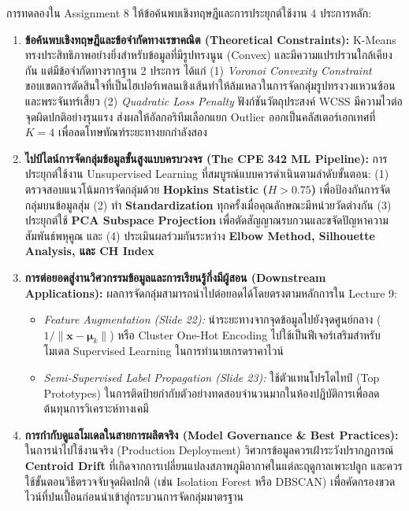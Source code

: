 \documentclass[12pt,a4paper]{article}
\begin{document}
การทดลองใน Assignment 8 ให้ข้อค้นพบเชิงทฤษฎีและการประยุกต์ใช้งาน 4 ประการหลัก:
\begin{enumerate}[leftmargin=1.5em, itemsep=2.0pt]
    \item \textbf{ข้อค้นพบเชิงทฤษฎีและข้อจำกัดทางเรขาคณิต (Theoretical Constraints):} K-Means ทรงประสิทธิภาพอย่างยิ่งสำหรับข้อมูลที่มีรูปทรงนูน (Convex) และมีความแปรปรวนใกล้เคียงกัน แต่มีข้อจำกัดทางรากฐาน 2 ประการ ได้แก่ (1) \textit{Voronoi Convexity Constraint} ขอบเขตการตัดสินใจที่เป็นไฮเปอร์เพลนเชิงเส้นทำให้ล้มเหลวในการจัดกลุ่มรูปทรงวงแหวนซ้อนและพระจันทร์เสี้ยว (2) \textit{Quadratic Loss Penalty} ฟังก์ชันวัตถุประสงค์ WCSS มีความไวต่อจุดผิดปกติอย่างรุนแรง ส่งผลให้อัลกอริทึมเลือกแยก Outlier ออกเป็นคลัสเตอร์เอกเทศที่ $K=4$ เพื่อลดโทษทัณฑ์ระยะทางยกกำลังสอง
    \item \textbf{ไปป์ไลน์การจัดกลุ่มข้อมูลขั้นสูงแบบครบวงจร (The CPE 342 ML Pipeline):} การประยุกต์ใช้งาน Unsupervised Learning ที่สมบูรณ์แบบควรดำเนินตามลำดับขั้นตอน: (1) ตรวจสอบแนวโน้มการจัดกลุ่มด้วย \textbf{Hopkins Statistic ($H > 0.75$)} เพื่อป้องกันการจัดกลุ่มบนข้อมูลสุ่ม (2) ทำ \textbf{Standardization} ทุกครั้งเมื่อคุณลักษณะมีหน่วยวัดต่างกัน (3) ประยุกต์ใช้ \textbf{PCA Subspace Projection} เพื่อตัดสัญญาณรบกวนและขจัดปัญหาความสัมพันธ์พหุคูณ และ (4) ประเมินผลร่วมกันระหว่าง \textbf{Elbow Method, Silhouette Analysis, และ CH Index}
    \item \textbf{การต่อยอดสู่งานวิศวกรรมข้อมูลและการเรียนรู้กึ่งมีผู้สอน (Downstream Applications):} ผลการจัดกลุ่มสามารถนำไปต่อยอดได้โดยตรงตามหลักการใน Lecture 9:
    \begin{itemize}[leftmargin=1.2em, itemsep=1.0pt, topsep=1.0pt]
        \item \textit{Feature Augmentation (Slide 22):} นำระยะทางจากจุดข้อมูลไปยังจุดศูนย์กลาง ($1/\|\mathbf{x} - \boldsymbol{\mu}_k\|$) หรือ Cluster One-Hot Encoding ไปใช้เป็นฟีเจอร์เสริมสำหรับโมเดล Supervised Learning ในการทำนายเกรดราคาไวน์
        \item \textit{Semi-Supervised Label Propagation (Slide 23):} ใช้ตัวแทนโปรโตไทป์ (Top Prototypes) ในการติดป้ายกำกับตัวอย่างทดสอบจำนวนมากในห้องปฏิบัติการเพื่อลดต้นทุนการวิเคราะห์ทางเคมี
    \end{itemize}
    \item \textbf{การกำกับดูแลโมเดลในสายการผลิตจริง (Model Governance \& Best Practices):} ในการนำไปใช้งานจริง (Production Deployment) วิศวกรข้อมูลควรเฝ้าระวังปรากฏการณ์ \textbf{Centroid Drift} ที่เกิดจากการเปลี่ยนแปลงสภาพภูมิอากาศในแต่ละฤดูกาลเพาะปลูก และควรใช้ขั้นตอนวิธีตรวจจับจุดผิดปกติ (เช่น Isolation Forest หรือ DBSCAN) เพื่อคัดกรองขวดไวน์ที่ปนเปื้อนก่อนนำเข้าสู่กระบวนการจัดกลุ่มมาตรฐาน
\end{enumerate}
\end{document}
